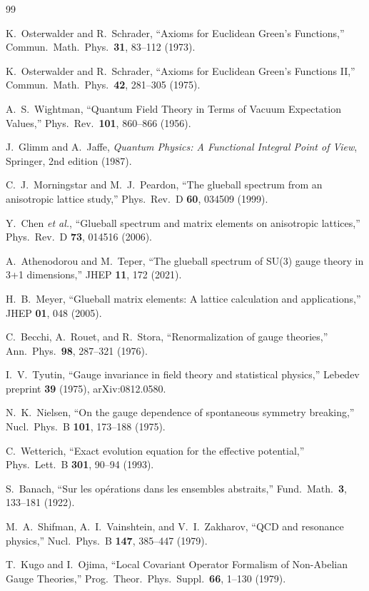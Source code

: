 \documentclass[11pt,a4paper]{article}
\theoremstyle{plain}
\theoremstyle{definition}
\begin{document}
\begin{thebibliography}{99}

K.~Osterwalder and R.~Schrader,
``Axioms for Euclidean Green's Functions,''
Commun.\ Math.\ Phys.\ \textbf{31}, 83--112 (1973).

K.~Osterwalder and R.~Schrader,
``Axioms for Euclidean Green's Functions II,''
Commun.\ Math.\ Phys.\ \textbf{42}, 281--305 (1975).

A.~S.~Wightman,
``Quantum Field Theory in Terms of Vacuum Expectation Values,''
Phys.\ Rev.\ \textbf{101}, 860--866 (1956).

J.~Glimm and A.~Jaffe,
\textit{Quantum Physics: A Functional Integral Point of View},
Springer, 2nd edition (1987).

C.~J.~Morningstar and M.~J.~Peardon,
``The glueball spectrum from an anisotropic lattice study,''
Phys.\ Rev.\ D \textbf{60}, 034509 (1999).

Y.~Chen \textit{et al.},
``Glueball spectrum and matrix elements on anisotropic lattices,''
Phys.\ Rev.\ D \textbf{73}, 014516 (2006).

A.~Athenodorou and M.~Teper,
``The glueball spectrum of SU(3) gauge theory in 3+1 dimensions,''
JHEP \textbf{11}, 172 (2021).

H.~B.~Meyer,
``Glueball matrix elements: A lattice calculation and applications,''
JHEP \textbf{01}, 048 (2005).

C.~Becchi, A.~Rouet, and R.~Stora,
``Renormalization of gauge theories,''
Ann.\ Phys.\ \textbf{98}, 287--321 (1976).

I.~V.~Tyutin,
``Gauge invariance in field theory and statistical physics,''
Lebedev preprint \textbf{39} (1975), arXiv:0812.0580.

N.~K.~Nielsen,
``On the gauge dependence of spontaneous symmetry breaking,''
Nucl.\ Phys.\ B \textbf{101}, 173--188 (1975).

C.~Wetterich,
``Exact evolution equation for the effective potential,''
Phys.\ Lett.\ B \textbf{301}, 90--94 (1993).

S.~Banach,
``Sur les opérations dans les ensembles abstraits,''
Fund.\ Math.\ \textbf{3}, 133--181 (1922).

M.~A.~Shifman, A.~I.~Vainshtein, and V.~I.~Zakharov,
``QCD and resonance physics,''
Nucl.\ Phys.\ B \textbf{147}, 385--447 (1979).

T.~Kugo and I.~Ojima,
``Local Covariant Operator Formalism of Non-Abelian Gauge Theories,''
Prog.\ Theor.\ Phys.\ Suppl.\ \textbf{66}, 1--130 (1979).
\end{thebibliography}
\end{document}
